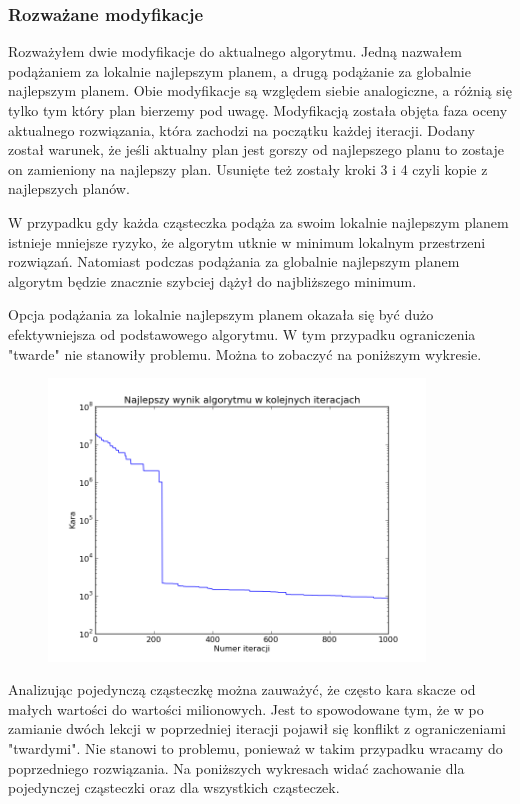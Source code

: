 \subsubsection{Rozważane modyfikacje}
\par Rozważyłem dwie modyfikacje do aktualnego algorytmu. Jedną nazwałem podążaniem za lokalnie najlepszym planem, a drugą podążanie za globalnie najlepszym planem. Obie modyfikacje są względem siebie analogiczne, a różnią się tylko tym który plan bierzemy pod uwagę. Modyfikacją została objęta faza oceny aktualnego rozwiązania, która zachodzi na początku każdej iteracji. Dodany został warunek, że jeśli aktualny plan jest gorszy od najlepszego planu to zostaje on zamieniony na najlepszy plan. Usunięte też zostały kroki 3 i 4 czyli kopie z najlepszych planów.
\par W przypadku gdy każda cząsteczka podąża za swoim lokalnie najlepszym planem istnieje mniejsze ryzyko, że algorytm utknie w minimum lokalnym przestrzeni rozwiązań. Natomiast podczas podążania za globalnie najlepszym planem algorytm będzie znacznie szybciej dążył do najbliższego minimum.
\par Opcja podążania za lokalnie najlepszym planem okazała się być dużo efektywniejsza od podstawowego algorytmu. W tym przypadku ograniczenia "twarde" nie stanowiły problemu. Można to zobaczyć na poniższym wykresie.
\begin{figure}[H]
\includegraphics[width=10cm]{img/localbest_penalty.png}
\centering
\end{figure}
\par Analizując pojedynczą cząsteczkę można zauważyć, że często kara skacze od małych wartości do wartości milionowych. Jest to spowodowane tym, że w po zamianie dwóch lekcji w poprzedniej iteracji pojawił się konflikt z ograniczeniami "twardymi". Nie stanowi to problemu, ponieważ w takim przypadku wracamy do poprzedniego rozwiązania. Na poniższych wykresach widać zachowanie dla pojedynczej cząsteczki oraz dla wszystkich cząsteczek.
